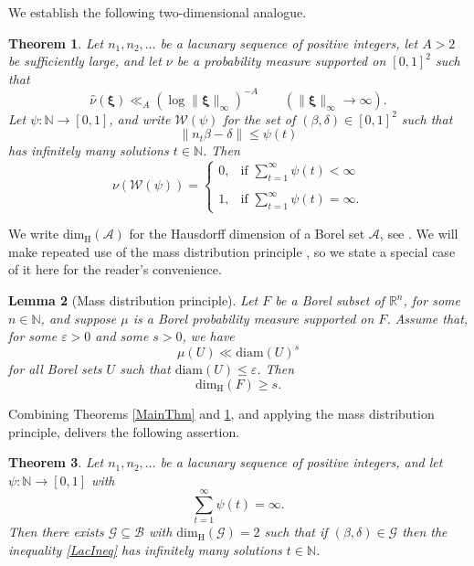 \documentclass[12pt, reqno]{amsart}
\newtheorem{thm}{Theorem}[section]
\newtheorem{lemma}[thm]{Lemma}
\theoremstyle{definition}
\theoremstyle{remark}
\numberwithin{equation}{section}
\def\bet{{\beta}}  \def\bfbet{{\boldsymbol \beta}}
\def\del{{\delta}} \def\Del{{\Delta}}
\def\eps{\varepsilon}
\def\le{\leqslant} \def\ge{\geqslant}
\def \bN {\mathbb N}
\def \bR {\mathbb R}
\def \bxi {{\boldsymbol{\xi}}}
\def \cA {\mathcal A}
\def \cB {\mathcal B}
\def \cG {\mathcal G}
\def \cW {\mathcal W}
\def \dim {\mathrm{dim}}
\def \dimH {\dim_{\mathrm{H}}}
\def \diam {{\mathrm{diam}}}
\begin{document}
	We establish the following two-dimensional analogue.
	
	\begin{thm} \label{LacApprox}
		Let $n_1, n_2, \ldots$ be a lacunary sequence of positive integers,
		let $A > 2$ be sufficiently large, and let $\nu$ be a probability measure supported on $[0,1]^2$ such that
		\begin{equation}
			\label{LogDecay}
			\widehat \nu(\bxi) \ll_A 
			(\log \| \bxi \|_\infty)^{-A}
			\qquad 
			(\|\bxi \|_\infty \to \infty).
		\end{equation}
		Let 
		$\psi: \bN \to [0,1]$, and write
		$\cW(\psi)$ for the set of 
		$(\bet,\del) \in [0,1]^2$ such that
		\begin{equation}
			\label{LacIneq}
			\| n_t \bet - \del \| \le \psi(t)
		\end{equation}
		has infinitely many solutions $t \in \bN$. Then
		\[
		\nu(\cW(\psi)) =
		\begin{cases}
			0, &\text{if } \displaystyle
			\sum_{t=1}^\infty
			\psi(t) < \infty \\ \\
			1, &\text{if } \displaystyle
			\sum_{t=1}^\infty
			\psi(t) = \infty.
		\end{cases}
		\]
	\end{thm}
	
	We write $\dimH(\cA)$ for the Hausdorff dimension of a Borel set $\cA$, see \cite{Fal2014}. We will make repeated use of the mass distribution principle \cite[Chapter 4]{Fal2014}, so we state a special case of it here for the reader's convenience.
	
	\begin{lemma} [Mass distribution principle]
		\label{MDP}
		Let $F$ be a Borel subset of $\bR^n$, for some $n \in \bN$, and suppose $\mu$ is a Borel probability measure supported on $F$. Assume that, for some $\eps >0 $ and some $s > 0$, we have
		\[
		\mu(U) \ll \diam(U)^s
		\]
		for all Borel sets $U$ such that $\diam(U) \le \eps$. Then
		\[
		\dim_{\mathrm{H}}(F) \ge s.
		\]
	\end{lemma}
	
	Combining Theorems \ref{MainThm} and \ref{LacApprox}, and applying the mass distribution principle,
	delivers the following assertion. 
	
	\begin{thm} \label{LacThm}
		Let $n_1, n_2, \ldots$ be a lacunary sequence of positive integers,
		and let $\psi: \bN \to [0,1]$ with
		\[
		\sum_{t=1}^\infty \psi(t) = \infty.
		\]
		Then there exists $\cG \subseteq \cB$ with $\dimH(\cG) = 2$ such that if $(\bet, \del) \in \cG$ then the inequality
		\eqref{LacIneq} has infinitely many solutions $t \in \bN$. 
	\end{thm}
	
\end{document}
